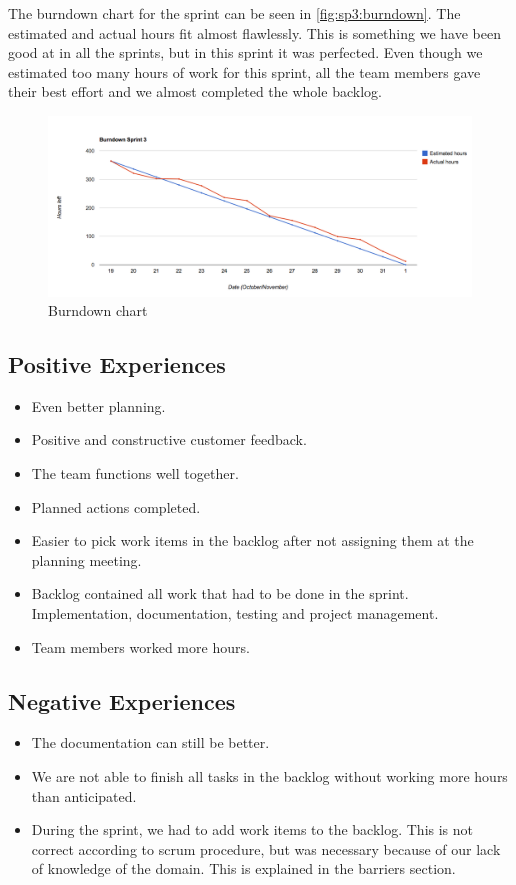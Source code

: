 The burndown chart for the sprint can be seen in \autoref{fig:sp3:burndown}. The estimated and actual hours fit almost flawlessly. This is something we have been good at in all the sprints, but in this sprint it was perfected. Even though we estimated too many hours of work for this sprint, all the team members gave their best effort and we almost completed the whole backlog. 
\begin{figure}[!htb]
	\includegraphics[width=\textwidth]{./sprints/img/burndown_chart_s3}
	\caption{Burndown chart\label{fig:sp3:burndown}}
\end{figure}

\subsection{Positive Experiences}
\begin{itemize}
	\item Even better planning.
	\item Positive and constructive customer feedback.
	\item The team functions well together.
	\item Planned actions completed.
	\item Easier to pick work items in the backlog after not assigning them at the planning meeting.
	\item Backlog contained all work that had to be done in the sprint. Implementation, documentation, testing and project management.
	\item Team members worked more hours. 
\end{itemize}

\subsection{Negative Experiences}
\begin{itemize}
	\item The documentation can still be better.
	\item We are not able to finish all tasks in the backlog without working more hours than anticipated.
	\item During the sprint, we had to add work items to the backlog. This is not correct according to \Gls{scrum} procedure, but was necessary because of our lack of knowledge of the domain. This is explained in the barriers section.  
\end{itemize}

